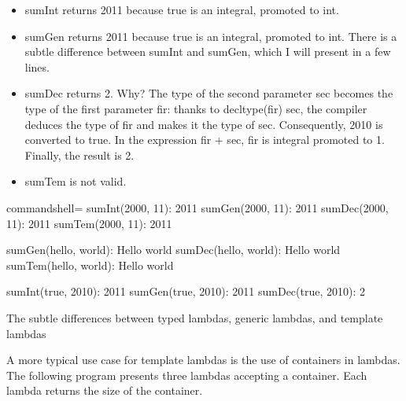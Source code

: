 \begin{itemize}
\item 
sumInt returns 2011 because true is an integral, promoted to int.

\item 
sumGen returns 2011 because true is an integral, promoted to int. There is a subtle difference between sumInt and sumGen, which I will present in a few lines.

\item 
sumDec returns 2. Why? The type of the second parameter sec becomes the type of the first parameter fir: thanks to decltype(fir) sec, the compiler deduces the type of fir and makes it the type of sec. Consequently, 2010 is converted to true. In the expression fir + sec, fir is integral promoted to 1. Finally, the result is 2.

\item 
sumTem is not valid.
\end{itemize}

\begin{tcblisting}{commandshell={}}
sumInt(2000, 11): 2011
sumGen(2000, 11): 2011
sumDec(2000, 11): 2011
sumTem(2000, 11): 2011

sumGen(hello, world): Hello world
sumDec(hello, world): Hello world
sumTem(hello, world): Hello world

sumInt(true, 2010): 2011
sumGen(true, 2010): 2011
sumDec(true, 2010): 2
\end{tcblisting}

\begin{center}
The subtle differences between typed lambdas, generic lambdas, and template lambdas
\end{center}

A more typical use case for template lambdas is the use of containers in lambdas. The following program presents three lambdas accepting a container. Each lambda returns the size of the container.

